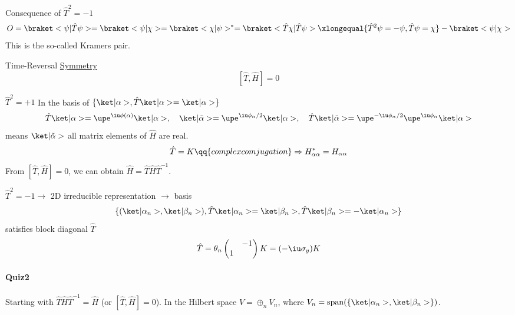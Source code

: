 \begin{enumext}
  \item Consequence of $\hat T^2 = -1$
  \[
    O = \braket<\psi|\hat T\psi> = \braket<\psi|\chi>
  = \braket<\chi|\psi>^* = \braket<\hat T\chi|\hat T\psi>
  \xlongequal{\hat T^2\psi = -\psi, \hat T\psi = \chi} -\braket<\psi|\chi>
  \]
  This is the so-called Kramers pair.
  \item Time-Reversal \underline{Symmetry}
  \[
    [\hat T, \hat H] = 0
  \]
  \begin{enumext}
    \item $\hat T^2 = +1$
    In the basis of $\{\ket|\alpha>, \hat T\ket|\alpha> = \ket|\alpha>\}$
    \[
      \hat T\ket|\alpha> = \upe^{\iu\phi(\alpha)} \ket|\alpha>, \quad
      \ket|\tilde\alpha> = \upe^{\iu\phi_\alpha/2} \ket|\alpha>,\quad
      \hat T\ket|\tilde\alpha> = \upe^{-\iu\phi_\alpha/2}
      \upe^{\iu\phi_\alpha} \ket|\alpha>
    \]
    means $\ket|\tilde\alpha>$ all matrix elements of $\hat H$ are real.
    \[
      \hat T = K \qq{complex comjugation} \Rightarrow
      H_{\alpha\alpha}^* = H_{\alpha\alpha}
    \]
    From $[\hat T, \hat H] = 0$, we can obtain
    $\hat H = \hat T\hat H\hat T^{-1}$.
    \item $\hat T^2 = -1 \to $ 2D irreducible representation $\to$ basis
    \[
      \{(\ket|\alpha_n>, \ket|\beta_n>),
      \hat T\ket|\alpha_n> = \ket|\beta_n>,
      \hat T\ket|\beta_n> = -\ket|\alpha_n>\}
    \]
    satisfies block diagonal $\hat T$
    \[
      \hat T = \theta_n \begin{pmatrix}
        & -1\\1
      \end{pmatrix} K = (-\iu\sigma_y) K
    \]
  \end{enumext}
\end{enumext}
\paragraph{Quiz2}
Starting with $\hat T\hat H \hat T^{-1} = \hat H$ (or $[\hat T, \hat H] = 0$).
In the Hilbert space $V = \oplus_n V_n$,
where $V_n = \operatorname{span} (\{\ket|\alpha_n>, \ket|\beta_n>\})$.

